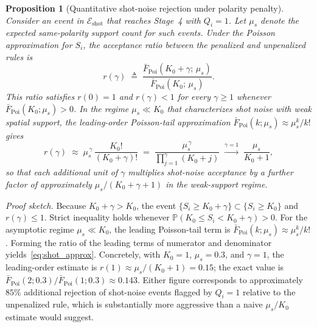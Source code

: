 \documentclass[a4paper,fleqn]{cas-dc}
\newtheorem{proposition}[theorem]{Proposition}
\newcommand{\Prob}{\mathbb{P}}
\newcommand{\Fbar}{\bar{F}}
\begin{document}
\begin{proposition}[Quantitative shot-noise rejection under polarity penalty]
\label{prop:shot}
Consider an event in $\mathcal{E}_{\text{shot}}$ that reaches Stage~4 with $Q_i = 1$. Let $\mu_s$ denote the expected same-polarity support count for such events. Under the Poisson approximation for $S_i$, the acceptance ratio between the penalized and unpenalized rules is
\begin{equation}
r(\gamma) \;\triangleq\; \frac{\Fbar_{\mathrm{Poi}}(K_0+\gamma;\,\mu_s)}{\Fbar_{\mathrm{Poi}}(K_0;\,\mu_s)}.
\label{eq:shot_ratio}
\end{equation}
This ratio satisfies $r(0)=1$ and $r(\gamma)<1$ for every $\gamma\geq 1$ whenever $\Fbar_{\mathrm{Poi}}(K_0;\mu_s)>0$. In the regime $\mu_s\ll K_0$ that characterizes shot noise with weak spatial support, the leading-order Poisson-tail approximation $\Fbar_{\mathrm{Poi}}(k;\mu_s)\approx \mu_s^{k}/k!$ gives
\begin{equation}
r(\gamma) \;\approx\; \mu_s^{\,\gamma}\,\frac{K_0!}{(K_0+\gamma)!}
\;=\; \frac{\mu_s^{\,\gamma}}{\prod_{j=1}^{\gamma}(K_0+j)}
\;\xrightarrow{\gamma=1}\; \frac{\mu_s}{K_0+1},
\label{eq:shot_approx}
\end{equation}
so that each additional unit of $\gamma$ multiplies shot-noise acceptance by a further factor of approximately $\mu_s/(K_0+\gamma+1)$ in the weak-support regime.
\end{proposition}

\noindent\textit{Proof sketch.}
Because $K_0{+}\gamma > K_0$, the event $\{S_i\geq K_0{+}\gamma\}\subset\{S_i\geq K_0\}$ and $r(\gamma)\leq 1$. Strict inequality holds whenever $\Prob(K_0\leq S_i < K_0{+}\gamma)>0$. For the asymptotic regime $\mu_s\ll K_0$, the leading Poisson-tail term is $\Fbar_{\text{Poi}}(k;\mu_s)\approx \mu_s^{k}/k!$. Forming the ratio of the leading terms of numerator and denominator yields~\eqref{eq:shot_approx}. Concretely, with $K_0=1$, $\mu_s=0.3$, and $\gamma=1$, the leading-order estimate is $r(1)\approx \mu_s/(K_0+1)=0.15$; the exact value is $\Fbar_{\text{Poi}}(2;0.3)/\Fbar_{\text{Poi}}(1;0.3)\approx 0.143$. Either figure corresponds to approximately $85\%$ additional rejection of shot-noise events flagged by $Q_i{=}1$ relative to the unpenalized rule, which is substantially more aggressive than a naive $\mu_s/K_0$ estimate would suggest.
\end{document}
